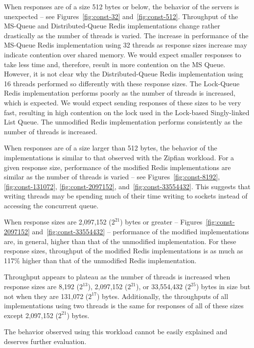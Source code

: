 \documentclass[sigconf, screen]{acmart}
\begin{document}
When responses are of a size 512 bytes or below, the behavior of the servers is unexpected -- see Figures~\ref{fig:const-32} and~\ref{fig:const-512}.
Throughput of the MS-Queue and Distributed-Queue Redis implementations change rather drastically as the number of threads is varied.
The increase in performance of the MS-Queue Redis implementation using 32 threads as response sizes increase may indicate contention over shared memory.
We would expect smaller responses to take less time and, therefore, result in more contention on the MS Queue.
However, it is not clear why the Distributed-Queue Redis implementation using 16 threads performed so differently with these response sizes.
The Lock-Queue Redis implementation performs poorly as the number of threads is increased, which is expected.
We would expect sending responses of these sizes to be very fast, resulting in high contention on the lock used in the Lock-based Singly-linked List Queue.
The unmodified Redis implementation performs consistently as the number of threads is increased.

When responses are of a size larger than 512 bytes, the behavior of the implementations is similar to that observed with the Zipfian workload.
For a given response size, performance of the modified Redis implementations are similar as the number of threads is varied -- see Figures~\ref{fig:const-8192}, \ref{fig:const-131072}, \ref{fig:const-2097152}, and~\ref{fig:const-33554432}.
This suggests that writing threads may be spending much of their time writing to sockets instead of accessing the concurrent queue.

When response sizes are 2,097,152 ($2^{21}$) bytes or greater -- Figures~\ref{fig:const-2097152} and~\ref{fig:const-33554432} -- performance of the modified implementations are, in general, higher than that of the unmodified implementation.
For these response sizes, throughput of the modified Redis implementations is as much as 117\% higher than that of the unmodified Redis implementation.

Throughput appears to plateau as the number of threads is increased when response sizes are 8,192 ($2^{13}$), 2,097,152 ($2^{21}$), or 33,554,432 ($2^{25}$) bytes in size but not when they are 131,072 ($2^{17}$) bytes.
Additionally, the throughputs of all implementations using two threads is the same for responses of all of these sizes except 2,097,152 ($2^{21}$) bytes.

The behavior observed using this workload cannot be easily explained and deserves further evaluation.
\end{document}
